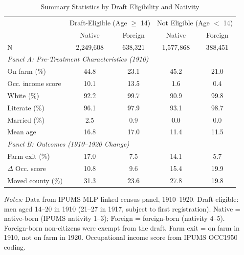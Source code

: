 \begin{table}[t]
\centering
\begin{threeparttable}
\caption{Summary Statistics by Draft Eligibility and Nativity}
\label{tab:summary}
\begin{tabular}{lcccc}
\hline\hline
 & \multicolumn{2}{c}{Draft-Eligible (Age $\geq$ 14)} & \multicolumn{2}{c}{Not Eligible (Age $<$ 14)} \\
 & Native & Foreign & Native & Foreign \\
\hline
N & 2,249,608 & 638,321 & 1,577,868 & 388,451 \\
\hline
\multicolumn{5}{l}{\textit{Panel A: Pre-Treatment Characteristics (1910)}} \\
On farm (\%) & 44.8 & 23.1 & 45.2 & 21.0 \\
Occ. income score & 10.1 & 13.5 & 1.6 & 0.4 \\
White (\%) & 92.2 & 99.7 & 90.9 & 99.8 \\
Literate (\%) & 96.1 & 97.9 & 93.1 & 98.7 \\
Married (\%) & 2.5 & 0.9 & 0.0 & 0.0 \\
Mean age & 16.8 & 17.0 & 11.4 & 11.5 \\
\hline
\multicolumn{5}{l}{\textit{Panel B: Outcomes (1910--1920 Change)}} \\
Farm exit (\%) & 17.0 & 7.5 & 14.1 & 5.7 \\
$\Delta$ Occ. score & 10.8 & 9.6 & 15.4 & 19.9 \\
Moved county (\%) & 31.3 & 23.6 & 27.8 & 19.8 \\
\hline\hline
\end{tabular}
\begin{tablenotes}[flushleft]\small
\item \textit{Notes:} Data from IPUMS MLP linked census panel, 1910--1920. Draft-eligible: men aged 14--20 in 1910 (21--27 in 1917, subject to first registration). Native = native-born (IPUMS nativity 1--3); Foreign = foreign-born (nativity 4--5). Foreign-born non-citizens were exempt from the draft. Farm exit = on farm in 1910, not on farm in 1920. Occupational income score from IPUMS OCC1950 coding.
\end{tablenotes}
\end{threeparttable}
\end{table}

